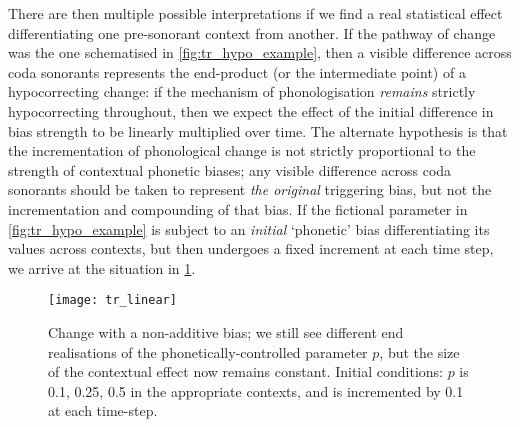There are then multiple possible interpretations if we find a real statistical effect differentiating one pre-sonorant context from another. If the pathway of change was the one schematised in \cref{fig:tr_hypo_example}, then a visible difference across coda sonorants represents the end-product (or the intermediate point) of a hypocorrecting change: if the mechanism of phonologisation \emph{remains} strictly hypocorrecting throughout, then we expect the effect of the initial difference in bias strength to be linearly multiplied over time. The alternate hypothesis is that the incrementation of phonological change is not strictly proportional to the strength of contextual phonetic biases; any visible difference across coda sonorants should be taken to represent \emph{the original} triggering bias, but not the incrementation and compounding of that bias. If the fictional parameter in \cref{fig:tr_hypo_example} is subject to an \emph{initial} `phonetic' bias differentiating its values across contexts, but then undergoes a fixed increment at each time step, we arrive at the situation in \cref{fig:tr_nonhypo_example}.

\begin{figure}[H]
  \centering
  \texttt{[image: tr\_linear]}
  \caption[A rough illustration of constant-slope change.]{Change with a non-additive bias; we still see different end realisations of the phonetically-controlled parameter $p$, but the size of the contextual effect now remains constant. Initial conditions: $p$ is 0.1, 0.25, 0.5 in the appropriate contexts, and is incremented by 0.1 at each time-step.}
  \label{fig:tr_nonhypo_example}
\end{figure}

